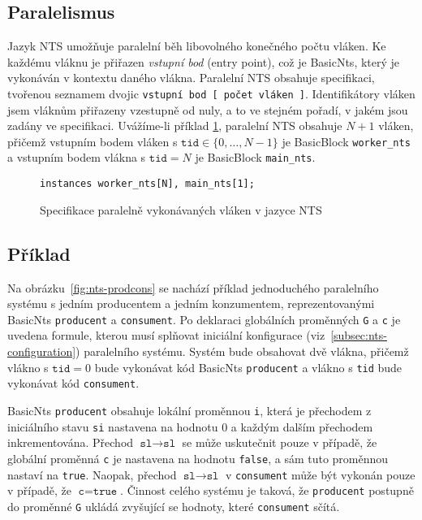 \documentclass[10pt,a4paper,notitlepage]{report}
\begin{document}
\subsection{Paralelismus}
\label{subsec:nts-paralelism}
Jazyk NTS umožňuje paralelní běh libovolného konečného počtu vláken. Ke každému vláknu je přiřazen \textit{vstupní bod} (entry point), což je BasicNts, který je vykonáván v kontextu daného vlákna. Paralelní NTS obsahuje specifikaci, tvořenou seznamem dvojic \texttt{vstupní bod [ počet vláken ]}. Identifikátory vláken jsem vláknům přiřazeny vzestupně od nuly, a to ve stejném pořadí, v jakém jsou zadány ve specifikaci.  Uvážíme-li příklad \ref{fig:nts-instances}, paralelní NTS obsahuje $N+1$ vláken, přičemž vstupním bodem vláken s $\texttt{tid} \in \{ 0, \ldots, N - 1 \}$ je BasicBlock \texttt{worker_nts} a vstupním bodem vlákna s $\texttt{tid} = N$ je BasicBlock \texttt{main_nts}.

\begin{figure}[h!]
\begin{lstlisting}
instances worker_nts[N], main_nts[1];
\end{lstlisting}
\caption{Specifikace paralelně vykonávaných vláken v jazyce NTS}
\label{fig:nts-instances}
\end{figure}

\subsection{Příklad}
Na obrázku~\ref{fig:nts-prodcons} se nachází příklad jednoduchého paralelního systému s jedním producentem a jedním konzumentem, reprezentovanými BasicNts \texttt{producent} a \texttt{consument}. Po deklaraci globálních proměnných \texttt{G} a \texttt{c} je uvedena formule, kterou musí splňovat iniciální konfigurace  (viz~\ref{subsec:nts-configuration}) paralelního systému. Systém bude obsahovat dvě vlákna, přičemž vlákno s $\texttt{tid} = 0$ bude vykonávat kód BasicNts \texttt{producent} a vlákno s \texttt{tid} bude vykonávat kód \texttt{consument}.

BasicNts \texttt{producent} obsahuje lokální proměnnou \texttt{i}, která je přechodem z iniciálního stavu \texttt{si} nastavena na hodnotu $0$ a každým dalším přechodem inkrementována. Přechod $\texttt{sl} \rightarrow \texttt{sl}$ se může uskutečnit pouze v případě, že globální proměnná \texttt{c} je nastavena na  hodnotu \texttt{false}, a sám tuto proměnnou nastaví na \texttt{true}. Naopak, přechod $\texttt{sl} \rightarrow \texttt{sl}$ v \texttt{consument} může být vykonán pouze v případě, že $\texttt{c} = \texttt{true}$. Činnost celého systému je taková, že \texttt{producent} postupně do proměnné \texttt{G} ukládá zvyšující se hodnoty, které \texttt{consument} sčítá.
\end{document}
